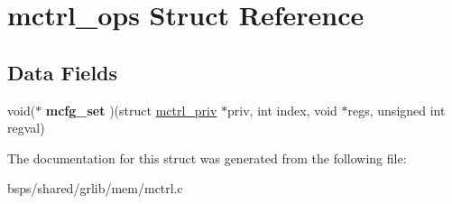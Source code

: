 \hypertarget{structmctrl__ops}{}\section{mctrl\+\_\+ops Struct Reference}
\label{structmctrl__ops}
\subsection*{Data Fields}
\begin{DoxyCompactItemize}
\item 
\mbox{\label{structmctrl__ops_a236739114598133592cc422e1b71a970}} 
void($\ast$ {\bfseries mcfg\+\_\+set} )(struct \mbox{\hyperlink{structmctrl__priv}{mctrl\+\_\+priv}} $\ast$priv, int index, void $\ast$regs, unsigned int regval)
\end{DoxyCompactItemize}


The documentation for this struct was generated from the following file\+:\begin{DoxyCompactItemize}
\item 
bsps/shared/grlib/mem/mctrl.\+c\end{DoxyCompactItemize}
